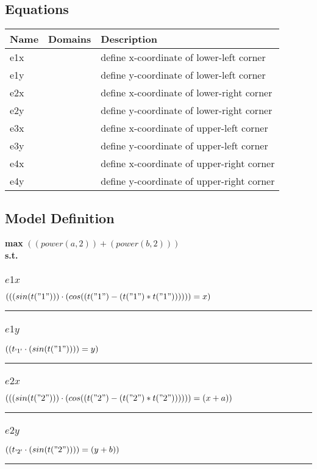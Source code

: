 \documentclass[11pt]{article}
\begin{document}
\subsection*{Equations}
\begin{tabularx}{\textwidth}{| l | l | X |}
\hline
\textbf{Name} & \textbf{Domains} & \textbf{Description}\\
\hline
\endhead

e1x &  & define x-coordinate of lower-left corner\\
e1y &  & define y-coordinate of lower-left corner\\
e2x &  & define x-coordinate of lower-right corner\\
e2y &  & define y-coordinate of lower-right corner\\
e3x &  & define x-coordinate of upper-left corner\\
e3y &  & define y-coordinate of upper-left corner\\
e4x &  & define x-coordinate of upper-right corner\\
e4y &  & define y-coordinate of upper-right corner\\
\hline
\end{tabularx}
\subsection*{Model Definition}
\textbf{max} $(( power(a,2) ) + ( power(b,2) ))$\\
\textbf{s.t.}
\subsubsection*{$e1x$}
$
((( sin(t("1")) ) \cdot ( cos((t("1") - (t("1") * t("1")))) )) = x)
$
\vspace{5pt}
\hrule
\subsubsection*{$e1y$}
$
((t_\text{\textquotesingle 1\textquotesingle} \cdot ( sin(t("1")) )) = y)
$
\vspace{5pt}
\hrule
\subsubsection*{$e2x$}
$
((( sin(t("2")) ) \cdot ( cos((t("2") - (t("2") * t("2")))) )) = (x + a))
$
\vspace{5pt}
\hrule
\subsubsection*{$e2y$}
$
((t_\text{\textquotesingle 2\textquotesingle} \cdot ( sin(t("2")) )) = (y + b))
$
\vspace{5pt}
\hrule
\end{document}
